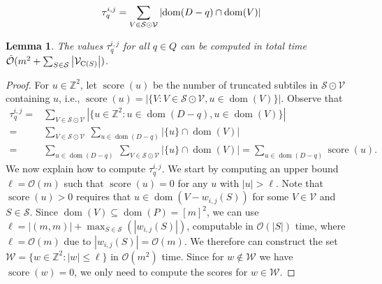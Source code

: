 \documentclass[11pt, letterpaper]{article}
\theoremstyle{plain}
\newtheorem{lemma}{Lemma}
\theoremstyle{definition}
\theoremstyle{remark}
\newcommand{\Z}{\mathbb{Z}}
\renewcommand{\O}{\mathcal{O}}
\newcommand{\tO}{\tilde{\mathcal{O}}}
\renewcommand{\S}{\mathcal{S}}
\newcommand{\V}{\mathcal{V}}
\DeclareMathOperator*{\score}{score}
\DeclareMathOperator*{\dom}{dom}
\newcommand{\absolute}[1]{\left\lvert#1\right\rvert}
\begin{document}
\begin{align}
\label{eq:group_by_gamma}
\tau_q^{i,j} = \sum_{V \in \S \odot \V} \absolute{\d{D-q} \cap \d{V}}
\end{align}

\newcommand{\W}{\mathcal{W}}
\begin{lemma}\label{primitive_conv}
The values $\tau_q^{i,j}$ for all $q \in Q$ can be computed in total time $\tO(m^2 + \sum_{S \in \S} \absolute{\V_{\getchar{S}}})$. 
\end{lemma}
\begin{proof}
For $u \in \Z^2$, let $\score(u)$ be the number of truncated subtiles in $\S \odot \V$ containing $u$, i.e., $\score(u) = \absolute{\{V : V \in \S \odot \V, u \in \dom(V)\}}$. Observe that
%
\begin{equation}
\begin{split}
\tau_q^{i,j} =&\sum_{V \in \S \odot \V} \absolute{\{u \in \Z^2 : u \in \dom(D-q), u \in \dom(V)\}}\\
=&\sum_{V \in \S \odot \V}\ \sum_{u \in \dom(D-q)}  \absolute{\{u\} \cap \dom(V)}\\
=&\sum_{u \in \dom(D-q)}\ \sum_{V \in \S \odot \V} \absolute{\{u\} \cap \dom(V)} = \sum_{u \in \dom(D-q)} \score(u).
\end{split}
\end{equation}
We now explain how to compute $\tau_q^{i,j}$. 
We start by computing an upper bound $\ell = \O(m)$ such that $\score(u) = 0$ for any $u$ with $\absolute{u} > \ell$. Note that $\score(u)>0$ requires that $u \in \dom(V - w_{i,j}(S))$ for some $V \in \V$ and $S \in \S$. Since $\dom(V) \subseteq \dom(P) = [m]^2$, we can use $\ell = \absolute{(m,m)} + \max_{S \in \S}(\absolute{w_{i, j}(S)})$, computable in $\O(\absolute{S})$ time, where $\ell = \O(m)$ due to $\absolute{w_{i,j}(S)} = \O(m)$.
%
We therefore can construct the set $\W = \{w \in \Z^2 : \absolute{w} \le \ell\}$ in $\O(m^2)$ time. Since for $w \notin \W$ we have $\score(w) = 0$, we only need to compute the scores for $w \in \W$. 


\end{proof}
\end{document}
